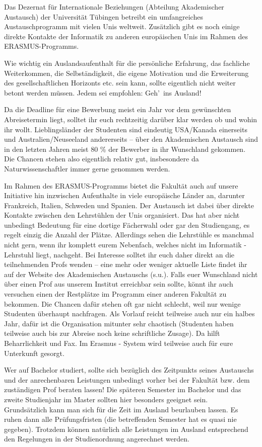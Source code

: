 Das Dezernat für Internationale Beziehungen (Abteilung Akademischer Austausch) der Universität Tübingen betreibt ein umfangreiches Austauschprogramm mit vielen Unis weltweit. Zusätzlich gibt es noch einige direkte Kontakte der Informatik zu anderen europäischen Unis im Rahmen des ERASMUS-Programms.

Wie wichtig ein Auslandsaufenthalt für die persönliche Erfahrung, das fachliche Weiterkommen, die Selbständigkeit, die eigene Motivation und die Erweiterung des gesellschaftlichen Horizonts etc. sein kann, sollte eigentlich nicht weiter betont werden müssen. Jedem sei empfohlen: Geh'\ ins Ausland!

Da die Deadline für eine Bewerbung meist ein Jahr vor dem gewünschten Abreisetermin liegt, solltet ihr euch rechtzeitig darüber klar werden ob und wohin ihr wollt.  Lieblingsländer der Studenten sind eindeutig USA/Kanada einerseits und Australien/Neuseeland andererseits -- über den Akademischen Austausch sind in den letzten Jahren meist 80 \% der Bewerber in ihr Wunschland gekommen. Die Chancen stehen also eigentlich relativ gut, insbesondere da Naturwissenschaftler immer gerne genommen werden.

Im Rahmen des ERASMUS-Programms bietet die Fakultät auch auf unsere Initiative hin inzwischen Aufenthalte in viele europäische Länder an, darunter Frankreich, Italien, Schweden und Spanien. Der Austausch ist dabei über direkte Kontakte zwischen den Lehrstühlen der Unis organisiert. Das hat aber nicht unbedingt Bedeutung für eine dortige Fächerwahl oder gar den Studiengang, es regelt einzig die Anzahl der Plätze. Allerdings sehen die Lehrstühle es manchmal nicht gern, wenn ihr komplett eurem Nebenfach, welches nicht im Informatik - Lehrstuhl liegt, nachgeht. 
Bei Interesse solltet ihr euch daher direkt an die teilnehmenden Profs wenden -- eine mehr oder weniger aktuelle Liste findet ihr auf der Website des Akademischen Austauschs (s.u.). Falls euer Wunschland nicht über einen Prof aus unserem Institut erreichbar sein sollte, könnt ihr auch versuchen einen der Restplätze im Programm einer anderen Fakultät zu bekommen. Die Chancen dafür stehen oft gar nicht schlecht, weil nur wenige Studenten überhaupt nachfragen. Als Vorlauf reicht teilweise auch nur ein halbes Jahr, dafür ist die Organisation mitunter sehr chaotisch (Studenten haben teilweise auch bis zur Abreise noch keine schriftliche Zusage). Da hilft Beharrlichkeit und Fax.  Im Erasmus - System wird teilweise auch für eure Unterkunft gesorgt. 

Wer auf Bachelor studiert, sollte sich bezüglich des Zeitpunkts seines Austauschs und der anrechenbaren Leistungen unbedingt vorher bei der Fakultät bzw. dem zuständigen Prof beraten lassen! Die späteren Semester im Bachelor und das zweite Studienjahr im Master sollten hier besonders geeignet sein.\\
Grundsätzlich kann man sich für die Zeit im Ausland beurlauben lassen. Es ruhen dann alle Prüfungsfristen (die betreffenden Semester hat es quasi nie gegeben). Trotzdem können natürlich alle Leistungen im Ausland entsprechend den Regelungen in der Studienordnung angerechnet werden.

